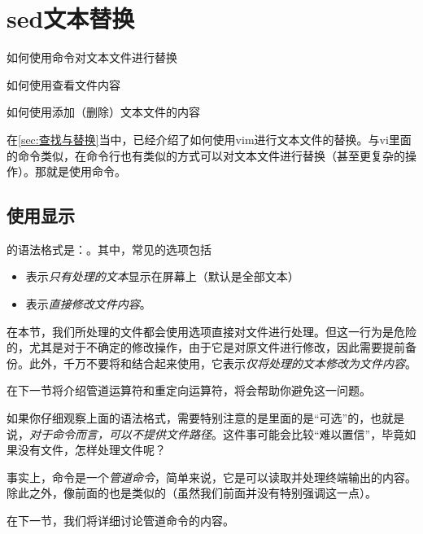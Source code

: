 \section{sed文本替换}\label{sec:sed文本替换}

\begin{Abstract}
    \item 如何使用命令对文本文件进行替换
    \item 如何使用查看文件内容
    \item 如何使用添加（删除）文本文件的内容
\end{Abstract}


在\ref{sec:查找与替换}当中，已经介绍了如何使用vim进行文本文件的替换。与vi里面的命令类似，在命令行也有类似的方式可以对文本文件进行替换（甚至更复杂的操作）。那就是使用命令。

\subsection{使用显示}\label{subsec:sed文本替换-使用sed显示}

的语法格式是：。其中，常见的选项包括

\begin{itemize}
    \item {} 表示\emph{只有处理的文本}显示在屏幕上（默认是全部文本）
    \item {} 表示\emph{直接修改文件内容}。
\end{itemize}

\begin{attention}
    在本节，我们所处理的文件都会使用选项直接对文件进行处理。但这一行为是危险的，尤其是对于不确定的修改操作，由于它是对原文件进行修改，因此需要提前备份。此外，千万不要将和结合起来使用，它表示\emph{仅将处理的文本修改为文件内容}。

    在下一节将介绍管道运算符和重定向运算符，将会帮助你避免这一问题。
\end{attention}

\begin{extend}
    如果你仔细观察上面的语法格式，需要特别注意的是里面的\code{[文件路径]}是“可选”的，也就是说，\emph{对于命令而言，可以不提供文件路径}。这件事可能会比较“难以置信”，毕竟如果没有文件，怎样处理文件呢？

    事实上，命令是一个\emph{管道命令}，简单来说，它是可以读取并处理终端输出的内容。除此之外，像前面的也是类似的（虽然我们前面并没有特别强调这一点）。

    在下一节，我们将详细讨论管道命令的内容。
\end{extend}

